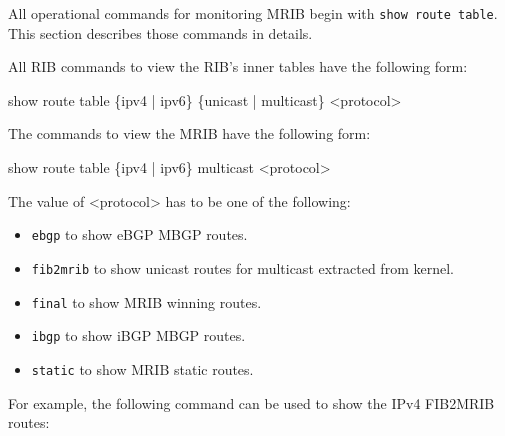All operational commands for monitoring MRIB begin with
{\tt show route table}. This section describes those commands in details.

All RIB commands to view the RIB's inner tables have the following form:

{\stt show route table \{ipv4 | ipv6\} \{unicast | multicast\} <protocol>}

The commands to view the MRIB have the following form:

{\stt show route table \{ipv4 | ipv6\} multicast <protocol>}

The value of {\stt <protocol>} has to be one of the following:

\begin{itemize}

  \item {\tt ebgp} to show eBGP MBGP routes.

  \item {\tt fib2mrib} to show unicast routes for multicast extracted
  from kernel.

  \item {\tt final} to show MRIB winning routes.

  \item {\tt ibgp} to show iBGP MBGP routes.

  \item {\tt static} to show MRIB static routes.

\end{itemize}

For example, the following command can be used to show the IPv4 FIB2MRIB
routes:

\vspace{0.1in}
\noindent{}
\vspace{0.1in}

